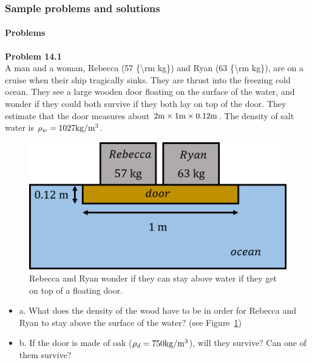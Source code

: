 \subsubsection{Sample problems and solutions}

\paragraph{Problems}

\begin{framed}
\textbf{Problem 14.1}\\
A man and a woman, Rebecca (57 \{{\textbackslash}rm kg\}) and Ryan (63 \{{\textbackslash}rm kg\}), are on a cruise when their ship tragically sinks. They are thrust into the freezing cold ocean. They see a large wooden door floating on the surface of the water, and wonder if they could both survive if they both lay on top of the door. They estimate that the door measures about $2 {\rm m}\times1 {\rm m}\times0.12 {\rm m}$. The density of salt water is $\rho_w=1027 {\rm kg/m^3}$.

\begin{figure}[!htbp]
\centering
\includegraphics[width=0.6\linewidth]{files/notthetitanic-35c349e53d4639c24b4cf5780a40df06.png}
\caption[]{Rebecca and Ryan wonder if they can stay above water if they get on top of a floating door.}
\label{fig:fluidmechanics:notthetitanic}
\end{figure}

\begin{itemize}
\item a. What does the density of the wood have to be in order for Rebecca and Ryan to stay above the surface of the water? (see Figure~\ref{fig:fluidmechanics:notthetitanic})
\item b. If the door is made of oak ($\rho_d=750 {\rm kg/m^3}$), will they survive? Can one of them survive?
\end{itemize}
\end{framed}

